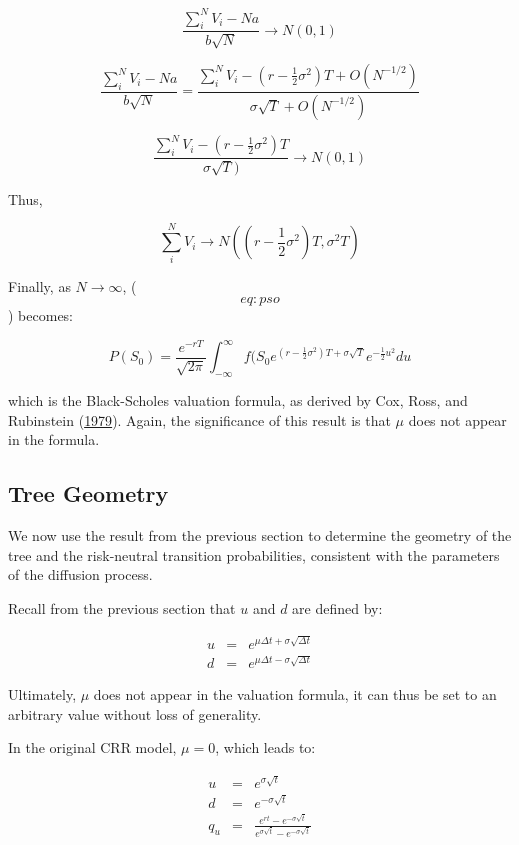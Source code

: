 \documentclass[justified]{tufte-book}
\begin{document}
\[\frac{\sum_i^N V_i - Na }{b \sqrt{N}} \rightarrow N(0,1)\]

\[\frac{\sum_i^N V_i - Na }{b \sqrt{N}} = \frac{\sum_i^N V_i - (r-\frac{1}{2} \sigma^2)T + O(N^{-1/2}) }{\sigma \sqrt{T} + O(N^{-1/2})}\]

\[\frac{\sum_i^N V_i - (r-\frac{1}{2} \sigma^2)T}{\sigma \sqrt{T})} \rightarrow N(0,1)\]

Thus,

\[\sum_i^N V_i \rightarrow  N \left( (r-\frac{1}{2} \sigma^2)T, \sigma^2 T \right)\]

Finally, as \(N \rightarrow \infty\), (\[eq:pso\]) becomes:

\[P(S_0) = \frac{e^{-rT}}{\sqrt{2\pi}} \int_{-\infty}^{\infty} f(S_0e^{(r-\frac{1}{2} \sigma^2)T + \sigma \sqrt{T}} e^{-\frac{1}{2} u^2} du\]

which is the Black-Scholes valuation formula, as derived by
Cox, Ross, and Rubinstein (\protect\hyperlink{ref-JohnC.Cox1979}{1979}). Again, the significance of this result is that \(\mu\)
does not appear in the formula.

\hypertarget{tree-geometry}{%
\subsection{Tree Geometry}\label{tree-geometry}}

We now use the result from the previous section to determine the
geometry of the tree and the risk-neutral transition probabilities,
consistent with the parameters of the diffusion process.

Recall from the previous section that \(u\) and \(d\) are defined by:

\[\begin{aligned}
u &=& e^{\mu \Delta t + \sigma \sqrt{\Delta t}} \\
d &=& e^{\mu \Delta t - \sigma \sqrt{\Delta t}}\end{aligned}\]

Ultimately, \(\mu\) does not appear in the valuation formula, it can thus
be set to an arbitrary value without loss of generality.

In the original CRR model, \(\mu = 0\), which leads to:

\[\begin{aligned}
 u &=& e^{\sigma \sqrt{t}} \\
d &=& e^{-\sigma \sqrt{t}} \\
q_u &=& \frac{e^{rt} - e^{-\sigma \sqrt{t}}}{e^{\sigma \sqrt{t}} - e^{-\sigma \sqrt{t}}}\end{aligned}\]
\end{document}
